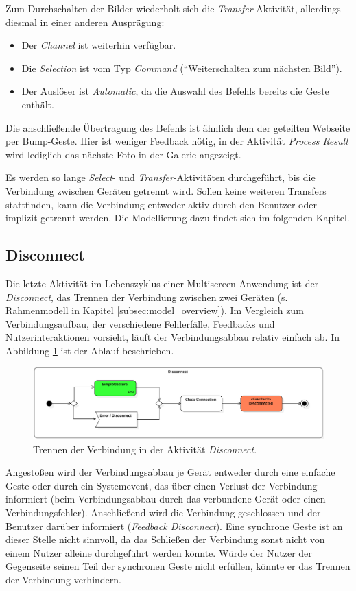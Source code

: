 Zum Durchschalten der Bilder wiederholt sich die \textit{Transfer}-Aktivität, allerdings diesmal in einer anderen Ausprägung:
\begin{itemize}
\item Der \textit{Channel} ist weiterhin verfügbar.
\item Die \textit{Selection} ist vom Typ \textit{Command} ("`Weiterschalten zum nächsten Bild"').
\item Der Auslöser ist \textit{Automatic}, da die Auswahl des Befehls bereits die Geste enthält.
\end{itemize}
Die anschließende Übertragung des Befehls ist ähnlich dem der geteilten Webseite per Bump-Geste. Hier ist weniger Feedback nötig, in der Aktivität \textit{Process Result} wird lediglich das nächste Foto in der Galerie angezeigt.

Es werden so lange \textit{Select}- und \textit{Transfer}-Aktivitäten durchgeführt, bis die Verbindung zwischen Geräten getrennt wird. Sollen keine weiteren Transfers stattfinden, kann die Verbindung entweder aktiv durch den Benutzer oder implizit getrennt werden. Die Modellierung dazu findet sich im folgenden Kapitel.

\subsection{Disconnect}
\label{subsec:disconnect}
Die letzte Aktivität im Lebenszyklus einer Multiscreen-Anwendung ist der \textit{Disconnect}, das Trennen der Verbindung zwischen zwei Geräten (s. Rahmenmodell in Kapitel \ref{subsec:model_overview}). Im Vergleich zum Verbindungsaufbau, der verschiedene Fehlerfälle, Feedbacks und Nutzerinteraktionen vorsieht, läuft der Verbindungsabbau relativ einfach ab. In Abbildung \ref{fig:disconnect} ist der Ablauf beschrieben.
\begin{figure}[h]
\centering
\includegraphics[width=1\textwidth]{bilder/disconnect.pdf}
\caption{Trennen der Verbindung in der Aktivität \textit{Disconnect}.}
\label{fig:disconnect}
\end{figure}

Angestoßen wird der Verbindungsabbau je Gerät entweder durch eine einfache Geste oder durch ein Systemevent, das über einen Verlust der Verbindung informiert (\zb beim Verbindungsabbau durch das verbundene Gerät oder einen Verbindungsfehler). Anschließend wird die Verbindung geschlossen und der Benutzer darüber informiert (\textit{Feedback Disconnect}). Eine synchrone Geste ist an dieser Stelle nicht sinnvoll, da das Schließen der Verbindung sonst nicht von einem Nutzer alleine durchgeführt werden könnte. Würde der Nutzer der Gegenseite seinen Teil der synchronen Geste nicht erfüllen, könnte er das Trennen der Verbindung verhindern.

